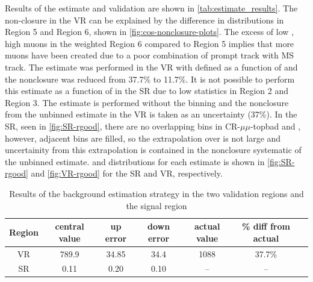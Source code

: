 Results of the estimate and validation are shown in \autoref{tab:estimate_results}. The non-closure in the VR can be explained by the difference in \absdz distributions in Region 5 and Region 6, shown in \autoref{fig:cos-nonclosure-plots}. The excess of low \absdz, high \chiCB muons in the weighted Region 6 compared to Region 5 implies that more muons have been created due to a poor combination of prompt track with MS track. The estimate was performed in the VR with \rgood  defined as a function of \absdz and the nonclosure was reduced from 37.7\% to 11.7\%. It is not possible to perform this estimate as a function of \absdz in the SR due to low statistics in Region 2 and Region 3. The estimate is performed without the \absdz binning and the nonclosure from the unbinned estimate in the VR is taken as an uncertainty (37\%). In the SR, seen in \autoref{fig:SR-rgood}, there are no overlapping \absdz bins in CR-$\mu\mu$-topbad and \rgood, however, adjacent bins are filled, so the extrapolation over \absdz is not large and uncertainity from this extrapolation is contained in the nonclosure systematic of the unbinned estimate. \rgood and \absdz distributions for each estimate is shown in \autoref{fig:SR-rgood} and \autoref{fig:VR-rgood} for the SR and VR, respectively.

\begin{table}
\centering{}
\begin{tabular}{ccccccc}
Region & central value & up error & down error & actual value & \% diff from actual \\
\hline
VR        & 789.9  & 34.85 & 34.4 & 1088 & 37.7\%  \\
SR        & 0.11 & 0.20  & 0.10  & --   & --   \\
\hline
\end{tabular}
\caption{Results of the background estimation strategy in the two validation regions and the signal region}
\label{tab:estimate_results}
\end{table}

